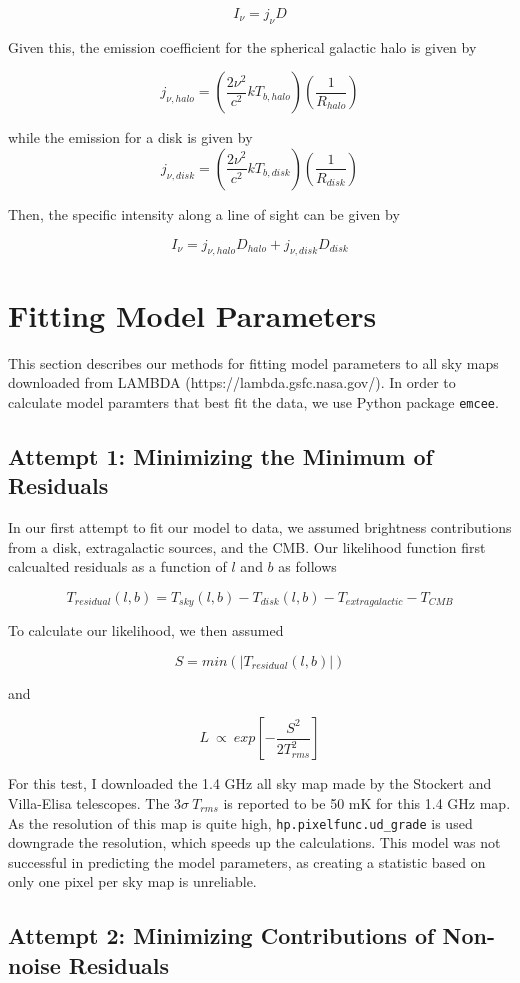 \documentclass[letterpaper, 10pt]{article}
\begin{document}
\[ I_{\nu} = j_{\nu}D \]

Given this, the emission coefficient for the spherical galactic halo is given by 

\[j_{\nu, halo} = \left(\frac{2\nu^{2}}{c^{2}}kT_{b, halo}\right)\left(\frac{1}{R_{halo}}\right)\]

while the emission for a disk is given by 
\[j_{\nu, disk} = \left(\frac{2\nu^{2}}{c^{2}}kT_{b, disk}\right)\left(\frac{1}{R_{disk}}\right)\]

Then, the specific intensity along a line of sight can be given by 

\[I_{\nu} = j_{\nu, halo}D_{halo} + j_{\nu, disk}D_{disk} \]

\section{Fitting Model Parameters}
This section describes our methods for fitting model parameters to all sky maps downloaded from LAMBDA (https://lambda.gsfc.nasa.gov/). In order to calculate model paramters that best fit the data, we use Python package \texttt{emcee}. 

\subsection{Attempt 1: Minimizing the Minimum of Residuals}
In our first attempt to fit our model to data, we assumed brightness contributions from a disk, extragalactic sources, and the CMB. Our likelihood function first calcualted residuals as a function of $l$ and $b$ as follows

\[ T_{residual}(l,b) = T_{sky}(l,b) - T_{disk}(l,b) - T_{extragalactic} - T_{CMB} \]

To calculate our likelihood, we then assumed

\[ S = min\left(|T_{residual}(l,b)|\right) \] 

and 

\[ L\ \propto\ exp\left[-\frac{S^2}{2T_{rms}^2}\right] \]

For this test, I downloaded the 1.4 GHz all sky map made by the Stockert and Villa-Elisa telescopes. The $3\sigma\ T_{rms}$ is reported to be 50 mK for this 1.4 GHz map. As the resolution of this map is quite high, \texttt{hp.pixelfunc.ud\_grade} is used downgrade the resolution, which speeds up the calculations. This model was not successful in predicting the model parameters, as creating a statistic based on only one pixel per sky map is unreliable. 

\subsection{Attempt 2: Minimizing Contributions of Non-noise Residuals}
\end{document}
